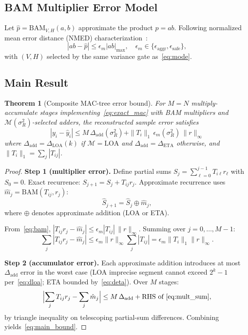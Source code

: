 \documentclass[journal]{IEEEtran}
\newtheorem{theorem}{Theorem}
\begin{document}
\subsection{BAM Multiplier Error Model}
Let $\hat{p}= \mathrm{BAM}_{V,H}(a,b)$ approximate the product $p=ab$.
Following normalized mean error distance (NMED) characterization~\cite{venkatesan2021}:
\begin{equation}
  |ab - \hat{p}| \le \epsilon_m |ab|_{\max}, \quad \epsilon_m \in \{\epsilon_{\mathrm{aggr}},\epsilon_{\mathrm{safe}}\},
  \label{eq:bam}
\end{equation}
with $(V,H)$ selected by the same variance gate as~\eqref{eq:mode}.

\subsection{Main Result}
\begin{theorem}[Composite MAC-tree error bound]
\label{thm:composite}
For $M=N$ multiply-accumulate stages implementing~\eqref{eq:exact_mac} with BAM multipliers
and $\mathcal{M}(\sigma_R^2)$-selected adders, the reconstructed sample error satisfies
\begin{equation}
  \boxed{
  |y_i - \hat{y}_i| \le
  M\,\Delta_{\mathrm{add}}(\sigma_R^2)
  + \|T_i\|_1\,\epsilon_m(\sigma_R^2)\,\|r\|_\infty
  }
  \label{eq:main_bound}
\end{equation}
where $\Delta_{\mathrm{add}} = \Delta_{\mathrm{LOA}}(k)$ if $\mathcal{M}=\mathrm{LOA}$ and
$\Delta_{\mathrm{add}}=\Delta_{\mathrm{ETA}}$ otherwise, and $\|T_i\|_1=\sum_j|T_{ij}|$.
\end{theorem}

\begin{proof}
\textbf{Step 1 (multiplier error).}
Define partial sums $S_j = \sum_{\ell=0}^{j-1} T_{i\ell} r_\ell$ with $S_0=0$.
Exact recurrence: $S_{j+1}=S_j + T_{ij} r_j$.
Approximate recurrence uses $\hat{m}_j = \mathrm{BAM}(T_{ij}, r_j)$:
\begin{equation}
  \hat{S}_{j+1} = \hat{S}_j \oplus \hat{m}_j,
\end{equation}
where $\oplus$ denotes approximate addition (LOA or ETA).

From~\eqref{eq:bam}, $|T_{ij}r_j - \hat{m}_j| \le \epsilon_m |T_{ij}|\,\|r\|_\infty$.
Summing over $j=0,\ldots,M-1$:
\begin{equation}
  \sum_j |T_{ij}r_j - \hat{m}_j| \le \epsilon_m \|r\|_\infty \sum_j |T_{ij}| = \epsilon_m \|T_i\|_1 \|r\|_\infty.
  \label{eq:mult_sum}
\end{equation}

\textbf{Step 2 (accumulator error).}
Each approximate addition introduces at most $\Delta_{\mathrm{add}}$ error in the worst case
(LOA imprecise segment cannot exceed $2^k-1$ per~\eqref{eq:dloa}; ETA bounded by~\eqref{eq:deta}).
Over $M$ stages:
\begin{equation}
  \Bigl|\sum_j T_{ij}r_j - \sum_j \hat{m}_j\Bigr| \le M\,\Delta_{\mathrm{add}} + \text{RHS of~\eqref{eq:mult_sum}},
\end{equation}
by triangle inequality on telescoping partial-sum differences. Combining yields~\eqref{eq:main_bound}.
\end{proof}
\end{document}
